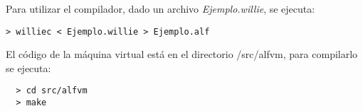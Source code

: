 

  Para utilizar el compilador, dado un archivo \textit{Ejemplo.willie}, se
ejecuta:

\begin{Verbatim}
> williec < Ejemplo.willie > Ejemplo.alf
\end{Verbatim}



El código de la máquina virtual está en el directorio
  /src/alfvm, para compilarlo se ejecuta:
\begin{verbatim}
  > cd src/alfvm
  > make
\end{verbatim}


